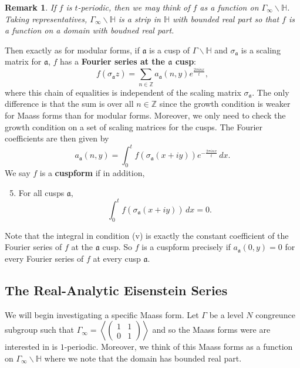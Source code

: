 \documentclass[12pt]{book}
\newtheorem{remark}{Remark}[section]
\theoremstyle{definition}\newframedtheorem{method}{Method}
\newcommand{\mf}{\mathfrak}
\newcommand{\Z}{\mathbb{Z}}
\renewcommand{\H}{\mathbb{H}}
\newcommand{\s}{\sigma}
\newcommand{\G}{\Gamma}
\newcommand{\<}{\langle}
\renewcommand{\>}{\rangle}
\newcommand{\GH}{\G\backslash\H}
\begin{document}
      \begin{remark}
        If $f$ is $t$-periodic, then we may think of $f$ as a function on $\G_{\infty}\backslash\H$. Taking representatives, $\G_{\infty}\backslash\H$ is a strip in $\H$ with bounded real part so that $f$ is a function on a domain with boudned real part.
      \end{remark}

      Then exactly as for modular forms, if $\mf{a}$ is a cusp of $\GH$ and $\s_{\mf{a}}$ is a scaling matrix for $\mf{a}$, $f$ has a \textbf{Fourier series at the $\mf{a}$ cusp}\index{Fourier series at the $\mf{a}$ cusp}:
      \[
        f(\s_{\mf{a}}z) = \sum_{n \in \Z}a_{\mf{a}}(n,y)e^{\frac{2\pi inx}{t}},
      \]
      where this chain of equalities is independent of the scaling matrix $\s_{\mf{a}}$. The only difference is that the sum is over all $n \in \Z$ since the growth condition is weaker for Maass forms than for modular forms. Moreover, we only need to check the growth condition on a set of scaling matrices for the cusps. The Fourier coefficients are then given by
      \[
        a_{\mf{a}}(n,y) = \int_{0}^{t}f(\s_{\mf{a}}(x+iy))e^{-\frac{2\pi inx}{t}}\,dx.
      \]
      We say $f$ is a \textbf{cuspform} if in addition,
      \begin{enumerate}[label=(\roman*)]
        \setcounter{enumi}{4}
        \item For all cusps $\mf{a}$,
        \[
          \int_{0}^{t}f(\s_{\mf{a}}(x+iy))\,dx = 0.
        \]
      \end{enumerate}
      Note that the integral in condition (v) is exactly the constant coefficient of the Fourier series of $f$ at the $\mf{a}$ cusp. So $f$ is a cuspform precisely if $a_{\mf{a}}(0,y) = 0$ for every Fourier series of $f$ at every cusp $\mf{a}$.
    \subsection*{The Real-Analytic Eisenstein Series}
      We will begin investigating a specific Maass form. Let $\G$ be a level $N$ congreunce subgroup such that $\G_{\infty} = \left\<\begin{pmatrix} 1 & 1 \\ 0 & 1 \end{pmatrix}\right\>$ and so the Maass forms were are interested in is $1$-periodic. Moreover, we think of this Maass forms as a function on $\G_{\infty}\backslash\H$ where we note that the domain has bounded real part.
\end{document}
